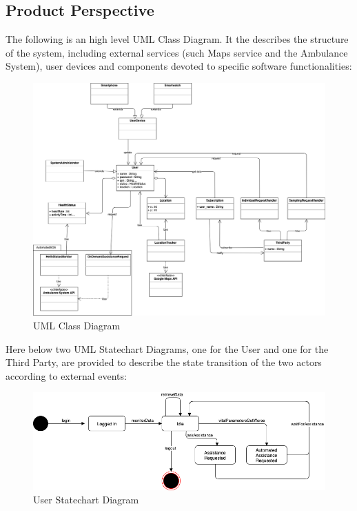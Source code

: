 \documentclass[12pt,a4paper]{article}
\begin{document}
		\subsection{Product Perspective}
			The following is an high level UML Class Diagram. It the describes the structure of the system, including external services (such Maps service and the Ambulance System), user devices and components devoted to specific software functionalities: 
			\begin{figure}[h]
				\centering
				\includegraphics[width=1.25\linewidth]{Images/uml}
				\caption{UML Class Diagram}
				\label{fig:uml}
			\end{figure}
			\newpage
			Here below two UML Statechart Diagrams, one for the User and one for the Third Party, are provided to describe the state transition of the two actors according to external events: 
			\begin{figure}[H]
				\centering
				\includegraphics[width=1.0\linewidth]{Images/statechart_user}
				\caption{User Statechart Diagram}
				\label{fig:statechart_user}
			\end{figure}
\end{document}

